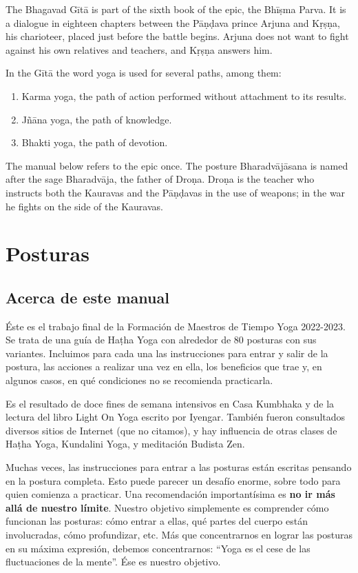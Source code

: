 The Bhagavad Gītā is part of the sixth book
of the epic, the Bhīṣma Parva. It is a
dialogue in eighteen chapters between the
Pāṇḍava prince Arjuna and Kṛṣṇa, his
charioteer, placed just before the battle
begins. Arjuna does not want to fight against
his own relatives and teachers, and Kṛṣṇa
answers him.

In the Gītā the word yoga is used for several
paths, among them:
\begin{enumerate}
\item Karma yoga, the path of action
performed without attachment to its results.
\item Jñāna yoga, the path of knowledge.
\item Bhakti yoga, the path of devotion.
\end{enumerate}

The manual below refers to the epic once. The
posture Bharadvājāsana is named after the
sage Bharadvāja, the father of Droṇa. Droṇa
is the teacher who instructs both the
Kauravas and the Pāṇḍavas in the use of
weapons; in the war he fights on the side of
the Kauravas.

\section{Posturas}
\label{section-posturas}

\subsection{Acerca de este manual}
\label{section-acerca-de-este-manual}

Éste es el trabajo final de la Formación de
Maestros de Tiempo Yoga 2022-2023. Se trata
de una guía de Haṭha Yoga con alrededor de 80
posturas con sus variantes. Incluimos para
cada una las instrucciones para entrar y
salir de la postura, las acciones a realizar
una vez en ella, los beneficios que trae y,
en algunos casos, en qué condiciones no se
recomienda practicarla.

Es el resultado de doce fines de semana
intensivos en Casa Kumbhaka y de la lectura
del libro Light On Yoga escrito por Iyengar.
También fueron consultados diversos sitios de
Internet (que no citamos), y hay influencia
de otras clases de Haṭha Yoga, Kundalini
Yoga, y meditación Budista Zen.

Muchas veces, las instrucciones para entrar a
las posturas están escritas pensando en la
postura completa. Esto puede parecer un
desafío enorme, sobre todo para quien
comienza a practicar. Una recomendación
importantísima es \textbf{no ir más allá de
nuestro límite}. Nuestro objetivo simplemente
es comprender cómo funcionan las posturas:
cómo entrar a ellas, qué partes del cuerpo
están involucradas, cómo profundizar, etc.
Más que concentrarnos en lograr las posturas
en su máxima expresión, debemos
concentrarnos: ``Yoga es el cese de las
fluctuaciones de la mente''. Ése es nuestro
objetivo.

